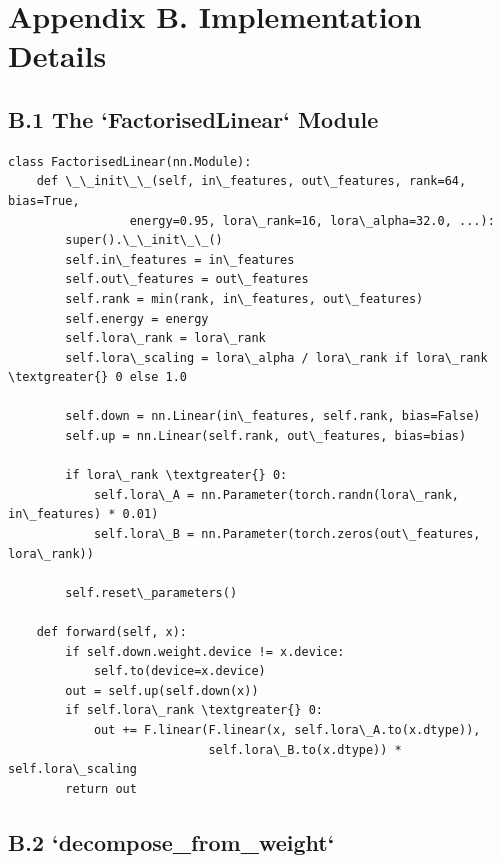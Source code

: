 
\section{Appendix B. Implementation Details}

\subsection{B.1 The `FactorisedLinear` Module}

\begin{lstlisting}
class FactorisedLinear(nn.Module):
    def \_\_init\_\_(self, in\_features, out\_features, rank=64, bias=True,
                 energy=0.95, lora\_rank=16, lora\_alpha=32.0, ...):
        super().\_\_init\_\_()
        self.in\_features = in\_features
        self.out\_features = out\_features
        self.rank = min(rank, in\_features, out\_features)
        self.energy = energy
        self.lora\_rank = lora\_rank
        self.lora\_scaling = lora\_alpha / lora\_rank if lora\_rank \textgreater{} 0 else 1.0
        
        self.down = nn.Linear(in\_features, self.rank, bias=False)
        self.up = nn.Linear(self.rank, out\_features, bias=bias)
        
        if lora\_rank \textgreater{} 0:
            self.lora\_A = nn.Parameter(torch.randn(lora\_rank, in\_features) * 0.01)
            self.lora\_B = nn.Parameter(torch.zeros(out\_features, lora\_rank))
        
        self.reset\_parameters()
    
    def forward(self, x):
        if self.down.weight.device != x.device:
            self.to(device=x.device)
        out = self.up(self.down(x))
        if self.lora\_rank \textgreater{} 0:
            out += F.linear(F.linear(x, self.lora\_A.to(x.dtype)), 
                            self.lora\_B.to(x.dtype)) * self.lora\_scaling
        return out
\end{lstlisting}

\subsection{B.2 `decompose\_from\_weight`}

